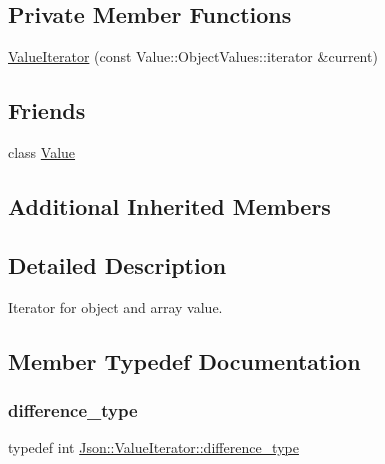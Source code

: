 \subsection*{Private Member Functions}
\begin{DoxyCompactItemize}
\item 
\hyperlink{classJson_1_1ValueIterator_afb06ea21add440c78c27dc49570460a5_afb06ea21add440c78c27dc49570460a5}{Value\+Iterator} (const Value\+::\+Object\+Values\+::iterator \&current)
\end{DoxyCompactItemize}
\subsection*{Friends}
\begin{DoxyCompactItemize}
\item 
class \hyperlink{classJson_1_1ValueIterator_aeceedf6e1a7d48a588516ce2b1983d6f_aeceedf6e1a7d48a588516ce2b1983d6f}{Value}
\end{DoxyCompactItemize}
\subsection*{Additional Inherited Members}


\subsection{Detailed Description}
Iterator for object and array value. 

\subsection{Member Typedef Documentation}
\mbox{\label{classJson_1_1ValueIterator_a2be1a9aa60bbfc8812e9dd1a7f1a8786_a2be1a9aa60bbfc8812e9dd1a7f1a8786}} 
\subsubsection{\texorpdfstring{difference\+\_\+type}{difference\_type}}
{\footnotesize\ttfamily typedef int \hyperlink{classJson_1_1ValueIterator_a2be1a9aa60bbfc8812e9dd1a7f1a8786_a2be1a9aa60bbfc8812e9dd1a7f1a8786}{Json\+::\+Value\+Iterator\+::difference\+\_\+type}}


